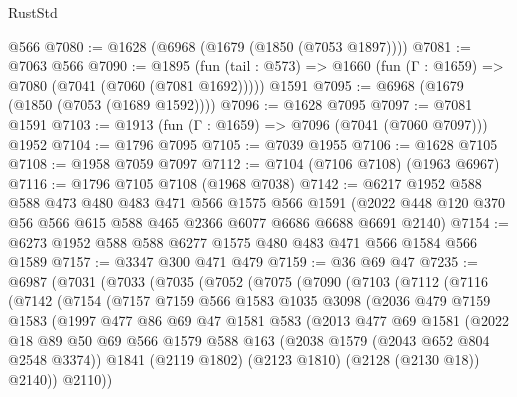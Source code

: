 \begin{lexlean}{RustStd}
\begin{coremodule}
    @566
@7080 := @1628 (@6968 (@1679 (@1850 (@7053 @1897))))
@7081 := @7063 @566
@7090 := @1895
    (fun (tail : @573) => @1660 (fun (Γ : @1659) => @7080 (@7041 (@7060 (@7081 @1692)))))
    @1591
@7095 := @6968 (@1679 (@1850 (@7053 (@1689 @1592))))
@7096 := @1628 @7095
@7097 := @7081 @1591
@7103 := @1913 (fun (Γ : @1659) => @7096 (@7041 (@7060 @7097))) @1952
@7104 := @1796 @7095
@7105 := @7039 @1955
@7106 := @1628 @7105
@7108 := @1958 @7059 @7097
@7112 := @7104 (@7106 @7108) (@1963 @6967)
@7116 := @1796 @7105 @7108 (@1968 @7038)
@7142 := @6217
    @1952
    @588
    @588
    @473
    @480
    @483
    @471
    @566
    @1575
    @566
    @1591
    (@2022 @448 @120 @370 @56 @566 @615 @588 @465 @2366 @6077 @6686 @6688 @6691 @2140)
@7154 := @6273 @1952 @588 @588 @6277 @1575 @480 @483 @471 @566 @1584 @566 @1589
@7157 := @3347 @300 @471 @479
@7159 := @36 @69 @47
@7235 := @6987
    (@7031
      (@7033
        (@7035
          (@7052
            (@7075
              (@7090
                (@7103
                  (@7112
                    (@7116
                      (@7142
                        (@7154
                          (@7157
                            @7159
                            @566
                            @1583
                            @1035
                            @3098
                            (@2036
                              @479
                              @7159
                              @1583
                              (@1997
                                @477
                                @86
                                @69
                                @47
                                @1581
                                @583
                                (@2013
                                  @477
                                  @69
                                  @1581
                                  (@2022
                                    @18
                                    @89
                                    @50
                                    @69
                                    @566
                                    @1579
                                    @588
                                    @163
                                    (@2038 @1579 (@2043 @652 @804 @2548 @3374))
                                    @1841
                                    (@2119 @1802)
                                    (@2123 @1810)
                                    (@2128 (@2130 @18))
                                    @2140))
                                @2110))

\end{coremodule}
\end{lexlean}
